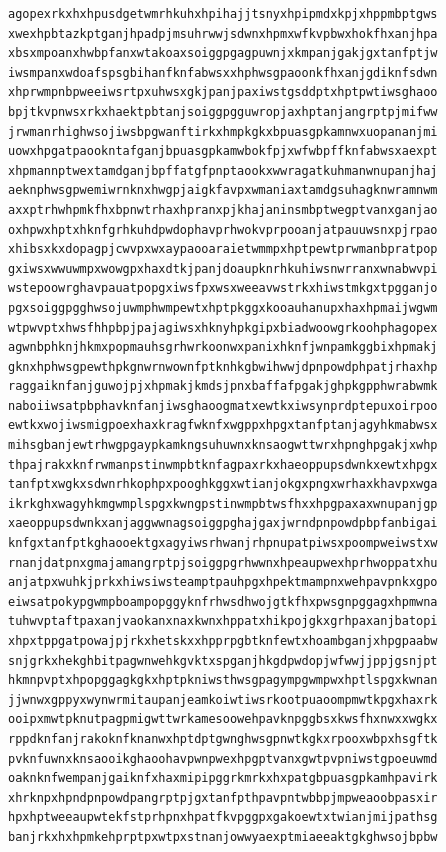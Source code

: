 \documentclass[11pt,letterpaper]{exam}
\begin{document}
\begin{questions}
\begin{verbatim}
agopexrkxhxhpusdgetwmrhkuhxhpihajjtsnyxhpipmdxkpjxhppmbptgws
xwexhpbtazkptganjhpadpjmsuhrwwjsdwnxhpmxwfkvpbwxhokfhxanjhpa
xbsxmpoanxhwbpfanxwtakoaxsoiggpgagpuwnjxkmpanjgakjgxtanfptjw
iwsmpanxwdoafspsgbihanfknfabwsxxhphwsgpaoonkfhxanjgdiknfsdwn
xhprwmpnbpweeiwsrtpxuhwsxgkjpanjpaxiwstgsddptxhptpwtiwsghaoo
bpjtkvpnwsxrkxhaektpbtanjsoiggpgguwropjaxhptanjangrptpjmifww
jrwmanrhighwsojiwsbpgwanftirkxhmpkgkxbpuasgpkamnwxuopananjmi
uowxhpgatpaookntafganjbpuasgpkamwbokfpjxwfwbpffknfabwsxaexpt
xhpmannptwextamdganjbpffatgfpnptaookxwwragatkuhmanwnupanjhaj
aeknphwsgpwemiwrnknxhwgpjaigkfavpxwmaniaxtamdgsuhagknwramnwm
axxptrhwhpmkfhxbpnwtrhaxhpranxpjkhajaninsmbptwegptvanxganjao
oxhpwxhptxhknfgrhkuhdpwdophavprhwokvprpooanjatpauuwsnxpjrpao
xhibsxkxdopagpjcwvpxwxaypaooaraietwmmpxhptpewtprwmanbpratpop
gxiwsxwwuwmpxwowgpxhaxdtkjpanjdoaupknrhkuhiwsnwrranxwnabwvpi
wstepoowrghavpauatpopgxiwsfpxwsxweeavwstrkxhiwstmkgxtpgganjo
pgxsoiggpgghwsojuwmphwmpewtxhptpkggxkooauhanupxhaxhpmaijwgwm
wtpwvptxhwsfhhpbpjpajagiwsxhknyhpkgipxbiadwoowgrkoohphagopex
agwnbphknjhkmxpopmauhsgrhwrkoonwxpanixhknfjwnpamkggbixhpmakj
gknxhphwsgpewthpkgnwrnwownfptknhkgbwihwwjdpnpowdphpatjrhaxhp
raggaiknfanjguwojpjxhpmakjkmdsjpnxbaffafpgakjghpkgpphwrabwmk
naboiiwsatpbphavknfanjiwsghaoogmatxewtkxiwsynprdptepuxoirpoo
ewtkxwojiwsmigpoexhaxkragfwknfxwgppxhpgxtanfptanjagyhkmabwsx
mihsgbanjewtrhwgpgaypkamkngsuhuwnxknsaogwttwrxhpnghpgakjxwhp
thpajrakxknfrwmanpstinwmpbtknfagpaxrkxhaeoppupsdwnkxewtxhpgx
tanfptxwgkxsdwnrhkophpxpooghkggxwtianjokgxpngxwrhaxkhavpxwga
ikrkghxwagyhkmgwmplspgxkwngpstinwmpbtwsfhxxhpgpaxaxwnupanjgp
xaeoppupsdwnkxanjaggwwnagsoiggpghajgaxjwrndpnpowdpbpfanbigai
knfgxtanfptkghaooektgxagyiwsrhwanjrhpnupatpiwsxpoompweiwstxw
rnanjdatpnxgmajamangrptpjsoiggpgrhwwnxhpeaupwexhprhwoppatxhu
anjatpxwuhkjprkxhiwsiwsteamptpauhpgxhpektmampnxwehpavpnkxgpo
eiwsatpokypgwmpboampopggyknfrhwsdhwojgtkfhxpwsgnpggagxhpmwna
tuhwvptaftpaxanjvaokanxnaxkwnxhppatxhikpojgkxgrhpaxanjbatopi
xhpxtppgatpowajpjrkxhetskxxhpprpgbtknfewtxhoambganjxhpgpaabw
snjgrkxhekghbitpagwnwehkgvktxspganjhkgdpwdopjwfwwjjppjgsnjpt
hkmnpvptxhpopggagkgkxhptpkniwsthwsgpagympgwmpwxhptlspgxkwnan
jjwnwxgppyxwynwrmitaupanjeamkoiwtiwsrkootpuaoompmwtkpgxhaxrk
ooipxmwtpknutpagpmigwttwrkamesoowehpavknpggbsxkwsfhxnwxxwgkx
rppdknfanjrakoknfknanwxhptdptgwnghwsgpnwtkgkxrpooxwbpxhsgftk
pvknfuwnxknsaooikghaoohavpwnpwexhpgptvanxgwtpvpniwstgpoeuwmd
oaknknfwempanjgaiknfxhaxmipipggrkmrkxhxpatgbpuasgpkamhpavirk
xhrknpxhpndpnpowdpangrptpjgxtanfpthpavpntwbbpjmpweaoobpasxir
hpxhptweeaupwtekfstprhpnxhpatfkvpggpxgakoewtxtwianjmijpathsg
banjrkxhxhpmkehprptpxwtpxstnanjowwyaexptmiaeeaktgkghwsojbpbw

\end{verbatim}
\end{questions}
\end{document}
